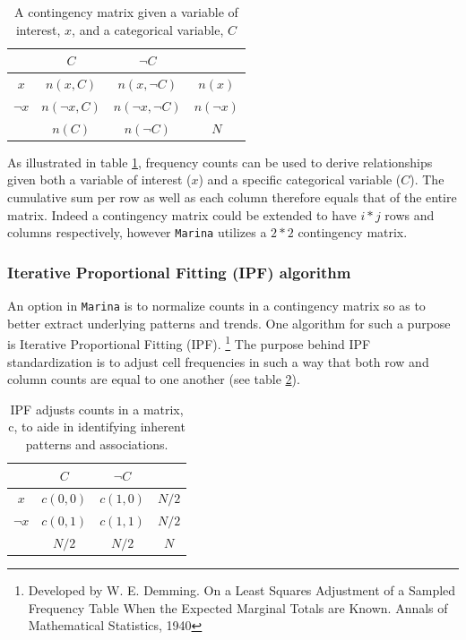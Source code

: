 \documentclass{article}
\begin{document}
\begin{table}[htbc]
	\centering
	\begin{tabular}{c | c | c | c}
	  & $C$    & $\neg{C}$ & \\ \hline
	$x$ & $n(x,C)$ & $n(x,\neg{C})$ & $n(x)$\\
	$\neg{x}$ & $n(\neg{x},C)$ & $n(\neg{x},\neg{C})$ & $n(\neg{x})$\\ \hline
	& $n(C)$ & $n(\neg{C})$ & $N$\\
	\end{tabular}
	\caption{A contingency matrix given a variable of interest, $x$, and a
	categorical variable, $C$}
	\label{table:contigencymatrix}
\end{table}
As illustrated in table \ref{table:contigencymatrix}, frequency counts can be
used to derive relationships given both a variable of interest ($x$)
and a specific categorical variable ($C$). The cumulative sum per row
as well as each column therefore equals that of the entire matrix. 
Indeed a contingency matrix could be extended
to have $i * j$ rows and columns respectively, however \texttt{Marina} utilizes 
a $2*2$ contingency matrix.

\subsubsection{Iterative Proportional Fitting (IPF) algorithm}
\label{section:ipf_algorithm}
An option in \texttt{Marina} is to normalize counts in a contingency matrix so as to
better extract underlying patterns and trends. One algorithm for such a purpose 
is Iterative Proportional Fitting (IPF).
\footnote{Developed by W. E. Demming. On a Least Squares Adjustment of a
Sampled Frequency Table When the Expected Marginal Totals are Known. Annals of
Mathematical Statistics, 1940}
The purpose behind IPF standardization is to adjust cell frequencies 
in such a way that both row and column counts are equal to one
another (see table \ref{table:ipf_matrix}).

\begin{table}[htbc]
	\centering
	\begin{tabular}{c | c | c | c}
	  & $C$    & $\neg{C}$ & \\ \hline
	$x$ & $c(0,0)$ & $c(1,0)$ & $N/2$\\
	$\neg{x}$ & $c(0,1)$ & $c(1,1)$ & $N/2$\\ \hline
	& $N/2$ & $N/2$ & $N$\\
	\end{tabular}
	\caption{IPF adjusts counts in a matrix, c, to aide in identifying inherent
	patterns and associations.}
	\label{table:ipf_matrix}
\end{table}
\end{document}

